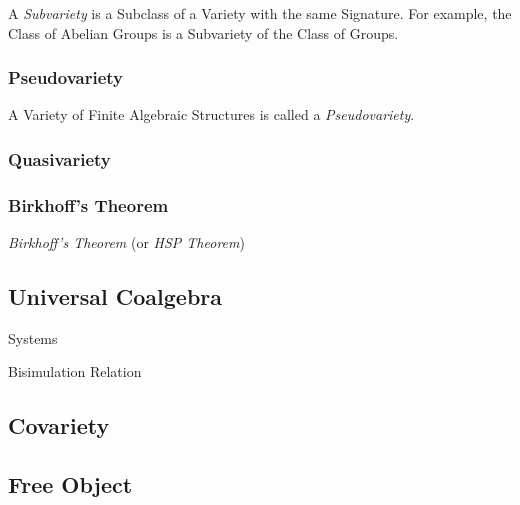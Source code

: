 A \emph{Subvariety} is a Subclass of a Variety with the same
Signature. For example, the Class of Abelian Groups is a Subvariety of
the Class of Groups.



\subsubsection{Pseudovariety}\label{sec:pseudovariety}

A Variety of Finite Algebraic Structures is called a
\emph{Pseudovariety}.



\subsubsection{Quasivariety}\label{sec:quasivariety}



\subsubsection{Birkhoff's Theorem}\label{sec:birkhoffs_theorem}
\cite{birkhoff35}

\emph{Birkhoff's Theorem} (or \emph{HSP Theorem})



\subsection{Universal Coalgebra}\label{sec:universal_coalgebra}

\cite{rutten00}

Systems

Bisimulation Relation



\subsection{Covariety}\label{sec:covariety}

\subsection{Free Object}\label{sec:free_object}

